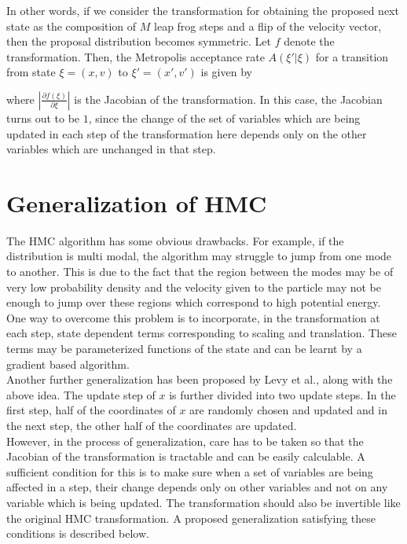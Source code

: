 \documentclass[letterpaper,english,10pt]{article}
\begin{document}
In other words, if we consider the transformation for obtaining the proposed next state as the composition of $M$ leap frog steps and a flip of the velocity vector, then the proposal distribution becomes symmetric. Let $f$ denote the transformation. Then, the Metropolis acceptance rate $A(\xi' | \xi)$ for a transition from state $\xi = (x,v)$ to $\xi' = (x',v')$ is given by


where $\left| \frac{\partial f(\xi)}{\partial \xi} \right|$ is the Jacobian of the transformation. In this case, the Jacobian turns out to be $1$, since the change of the set of variables which are being updated in each step of the transformation here depends only on the other variables which are unchanged in that step.

\section{Generalization of HMC}
The HMC algorithm has some obvious drawbacks. For example, if the distribution is multi modal, the algorithm may struggle to jump from one mode to another. This is due to the fact that the region between the modes may be of very low probability density and the velocity given to the particle may not be enough to jump over these regions which correspond to high potential energy. \\

One way to overcome this problem is to incorporate, in the transformation at each step, state dependent terms corresponding to scaling and translation\cite{levy2018generalizing}. These terms may be parameterized functions of the state and can be learnt by a gradient based algorithm. \\

Another further generalization has been proposed by Levy et al.\cite{levy2018generalizing}, along with the above idea. The update step of $x$ is further divided into two update steps. In the first step, half of the coordinates of $x$ are randomly chosen and updated and in the next step, the other half of the coordinates are updated. \\

However, in the process of generalization, care has to be taken so that the Jacobian of the transformation is tractable and can be easily calculable. A sufficient condition for this is to make sure when a set of variables are being affected in a step, their change depends only on other variables and not on any variable which is being updated. The transformation should also be invertible like the original HMC transformation. A proposed generalization satisfying these conditions is described below. \\
\end{document}
